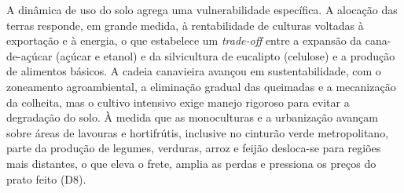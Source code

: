 \documentclass[
	12pt,				%
	openright,			%
	oneside,			%
	a4paper,			%
	chapter=TITLE,		%
	section=TITLE,		%
	english,			%
	french,				%
	spanish,			%
	brazil,				%
 ]{abntex2}
\begin{document}
A dinâmica de uso do solo agrega uma vulnerabilidade específica. A alocação
das terras responde, em grande medida, à rentabilidade de culturas voltadas à
exportação e à energia, o que estabelece um \textit{trade-off} entre a expansão
da cana-de-açúcar (açúcar e etanol) e da silvicultura de eucalipto (celulose) e a
produção de alimentos básicos. A cadeia canavieira avançou em sustentabilidade,
com o zoneamento agroambiental, a eliminação gradual das queimadas e a
mecanização da colheita, mas o cultivo intensivo exige manejo rigoroso para
evitar a degradação do solo. À medida que as monoculturas e a urbanização
avançam sobre áreas de lavouras e hortifrútis, inclusive no cinturão verde
metropolitano, parte da produção de legumes, verduras, arroz e feijão
desloca-se para regiões mais distantes, o que eleva o frete, amplia as perdas
e pressiona os preços do prato feito (D8).
\end{document}
